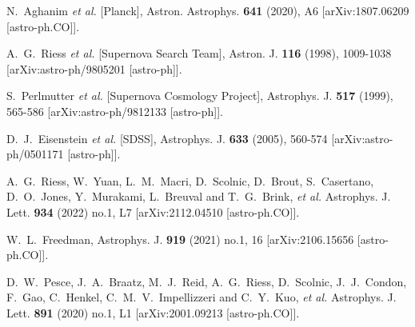 \documentclass[a4paper,11pt]{article}
\begin{document}
\begin{thebibliography}{99}

N.~Aghanim \textit{et al.} [Planck],
Astron. Astrophys. \textbf{641} (2020), A6
[arXiv:1807.06209 [astro-ph.CO]].

A.~G.~Riess \textit{et al.} [Supernova Search Team],
Astron. J. \textbf{116} (1998), 1009-1038
[arXiv:astro-ph/9805201 [astro-ph]].

S.~Perlmutter \textit{et al.} [Supernova Cosmology Project],
Astrophys. J. \textbf{517} (1999), 565-586
[arXiv:astro-ph/9812133 [astro-ph]].

D.~J.~Eisenstein \textit{et al.} [SDSS],
Astrophys. J. \textbf{633} (2005), 560-574
[arXiv:astro-ph/0501171 [astro-ph]].

A.~G.~Riess, W.~Yuan, L.~M.~Macri, D.~Scolnic, D.~Brout, S.~Casertano, D.~O.~Jones, Y.~Murakami, L.~Breuval and T.~G.~Brink, \textit{et al.}
Astrophys. J. Lett. \textbf{934} (2022) no.1, L7
[arXiv:2112.04510 [astro-ph.CO]].

W.~L.~Freedman,
Astrophys. J. \textbf{919} (2021) no.1, 16
[arXiv:2106.15656 [astro-ph.CO]].

D.~W.~Pesce, J.~A.~Braatz, M.~J.~Reid, A.~G.~Riess, D.~Scolnic, J.~J.~Condon, F.~Gao, C.~Henkel, C.~M.~V.~Impellizzeri and C.~Y.~Kuo, \textit{et al.}
Astrophys. J. Lett. \textbf{891} (2020) no.1, L1
[arXiv:2001.09213 [astro-ph.CO]].


\end{thebibliography}
\end{document}
